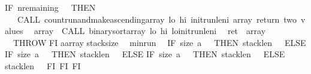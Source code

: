 \begin{isabellebody}
IF\ {\isacharparenleft}{\isasymacute}n{\isacharunderscore}remaining\ {\isacharless}\ {}{}{\isacharparenright}\ THEN\isanewline
\ \ \ CALL\ count{\isacharunderscore}run{\isacharunderscore}and{\isacharunderscore}make{\isacharunderscore}ascending{\isacharparenleft}{\isasymacute}array{\isacharcomma}\ {\isasymacute}lo{\isacharcomma}\ {\isasymacute}hi{\isacharcomma}\ {\isasymacute}init{\isacharunderscore}run{\isacharunderscore}len{\isacharunderscore}i{\isacharcomma}\ {\isasymacute}array{\isacharparenright}{\isacharsemicolon}{\isacharsemicolon}{\isacharparenleft}{\isacharasterisk}\ return\ two\ values{\isacharasterisk}{\isacharparenright}\isanewline
\ \ {\isasymacute}array\ {\isacharcolon}{\isacharequal}{\isacharequal}\ CALL\ binary{\isacharunderscore}sort{\isacharparenleft}{\isasymacute}array{\isacharcomma}\ {\isasymacute}lo{\isacharcomma}\ {\isasymacute}hi{\isacharcomma}\ {\isasymacute}lo{\isacharplus}{\isasymacute}init{\isacharunderscore}run{\isacharunderscore}len{\isacharunderscore}i{\isacharparenright}{\isacharsemicolon}{\isacharsemicolon}\isanewline
\ \ {\isasymacute}ret\ {\isacharcolon}{\isacharequal}{\isacharequal}\ {\isasymacute}array{\isacharsemicolon}{\isacharsemicolon}\isanewline
\ \ THROW\isanewline
FI{\isacharsemicolon}{\isacharsemicolon}\isanewline
{\isasymacute}a{\isacharcolon}{\isacharequal}{\isacharequal}{\isasymacute}array{\isacharsemicolon}{\isacharsemicolon}\isanewline
{\isasymacute}stack{\isacharunderscore}size\ {\isacharcolon}{\isacharequal}{\isacharequal}\ {}{\isacharsemicolon}{\isacharsemicolon}\isanewline
{\isasymacute}min{\isacharunderscore}run\ {\isacharcolon}{\isacharequal}{\isacharequal}\ {}{}{\isacharsemicolon}{\isacharsemicolon}\isanewline
IF\ size\ {\isasymacute}a\ {\isacharless}\ {}{}{}\ THEN\ {\isasymacute}stack{\isacharunderscore}len\ {\isacharcolon}{\isacharequal}{\isacharequal}\ {}\ ELSE\isanewline
IF\ size\ {\isasymacute}a\ {\isacharless}\ {}{}{}{}\ THEN\ {\isasymacute}stack{\isacharunderscore}len\ {\isacharcolon}{\isacharequal}{\isacharequal}\ {}\ ELSE\isanewline
IF\ size\ {\isasymacute}a\ {\isacharless}\ {}{}{}{}{}{}\ THEN\ {\isasymacute}stack{\isacharunderscore}len\ {\isacharcolon}{\isacharequal}{\isacharequal}\ {}{}\ ELSE\isanewline
{\isasymacute}stack{\isacharunderscore}len\ {\isacharcolon}{\isacharequal}{\isacharequal}\ {}{}\ FI\ FI\ FI{\isacharsemicolon}{\isacharsemicolon}\isanewline

\end{isabellebody}
